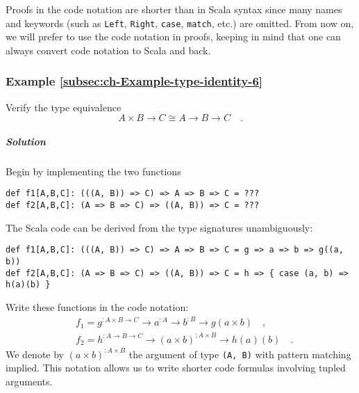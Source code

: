 Proofs in the code notation are shorter than in Scala syntax since
many names and keywords (such as \lstinline!Left!, \lstinline!Right!,
\lstinline!case!, \lstinline!match!, etc.) are omitted. From now
on, we will prefer to use the code notation in proofs, keeping in
mind that one can always convert code notation to Scala and back.

\subsubsection{Example \label{subsec:ch-Example-type-identity-6}\ref{subsec:ch-Example-type-identity-6}}

Verify the type equivalence 
\[
A\times B\rightarrow C\cong A\rightarrow B\rightarrow C\quad.
\]


\subparagraph{Solution}

Begin by implementing the two functions
\begin{lstlisting}
def f1[A,B,C]: (((A, B)) => C) => A => B => C = ???
def f2[A,B,C]: (A => B => C) => ((A, B)) => C = ???
\end{lstlisting}
The Scala code can be derived from the type signatures unambiguously:
\begin{lstlisting}
def f1[A,B,C]: (((A, B)) => C) => A => B => C = g => a => b => g((a, b))
def f2[A,B,C]: (A => B => C) => ((A, B)) => C = h => { case (a, b) => h(a)(b) }
\end{lstlisting}
Write these functions in the code notation:
\begin{align*}
 & f_{1}=g^{:A\times B\rightarrow C}\rightarrow a^{:A}\rightarrow b^{:B}\rightarrow g(a\times b)\quad,\\
 & f_{2}=h^{:A\rightarrow B\rightarrow C}\rightarrow\left(a\times b\right)^{:A\times B}\rightarrow h(a)(b)\quad.
\end{align*}
We denote by $\left(a\times b\right)^{:A\times B}$ the argument of
type \lstinline!(A, B)! with pattern matching implied. This notation
allows us to write shorter code formulas involving tupled arguments.


